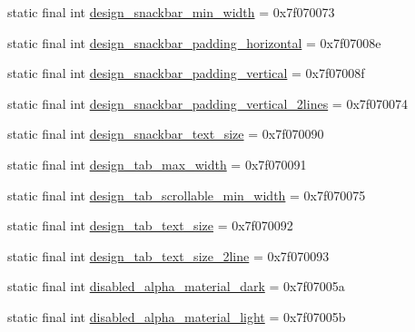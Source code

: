 \begin{CompactItemize}
\item 
static final int \hyperlink{classandroid_1_1support_1_1graphics_1_1drawable_1_1animated_1_1_r_1_1dimen_2cad18cdae992e62fc94d0e0b722ba17}{design\_\-snackbar\_\-min\_\-width} = 0x7f070073
\item 
static final int \hyperlink{classandroid_1_1support_1_1graphics_1_1drawable_1_1animated_1_1_r_1_1dimen_04cf6bea3618ea5459d512cd79711c48}{design\_\-snackbar\_\-padding\_\-horizontal} = 0x7f07008e
\item 
static final int \hyperlink{classandroid_1_1support_1_1graphics_1_1drawable_1_1animated_1_1_r_1_1dimen_9356b49013beb5a8123bce8245151bcc}{design\_\-snackbar\_\-padding\_\-vertical} = 0x7f07008f
\item 
static final int \hyperlink{classandroid_1_1support_1_1graphics_1_1drawable_1_1animated_1_1_r_1_1dimen_418c7ff8184a86f4131600ad2f8f3847}{design\_\-snackbar\_\-padding\_\-vertical\_\-2lines} = 0x7f070074
\item 
static final int \hyperlink{classandroid_1_1support_1_1graphics_1_1drawable_1_1animated_1_1_r_1_1dimen_9b15644ca71d44cdf4914f47d495cc76}{design\_\-snackbar\_\-text\_\-size} = 0x7f070090
\item 
static final int \hyperlink{classandroid_1_1support_1_1graphics_1_1drawable_1_1animated_1_1_r_1_1dimen_aac8383b2586c1712a14bc4a3dc2e253}{design\_\-tab\_\-max\_\-width} = 0x7f070091
\item 
static final int \hyperlink{classandroid_1_1support_1_1graphics_1_1drawable_1_1animated_1_1_r_1_1dimen_e87043aacc2fbac69d85211726f7f22e}{design\_\-tab\_\-scrollable\_\-min\_\-width} = 0x7f070075
\item 
static final int \hyperlink{classandroid_1_1support_1_1graphics_1_1drawable_1_1animated_1_1_r_1_1dimen_204f9d3cb5c09fc68ede0e41037fa015}{design\_\-tab\_\-text\_\-size} = 0x7f070092
\item 
static final int \hyperlink{classandroid_1_1support_1_1graphics_1_1drawable_1_1animated_1_1_r_1_1dimen_bc3a540219acf1014e3d1d0e96bba5d0}{design\_\-tab\_\-text\_\-size\_\-2line} = 0x7f070093
\item 
static final int \hyperlink{classandroid_1_1support_1_1graphics_1_1drawable_1_1animated_1_1_r_1_1dimen_4da89a17ce1795415d4f99305b369137}{disabled\_\-alpha\_\-material\_\-dark} = 0x7f07005a
\item 
static final int \hyperlink{classandroid_1_1support_1_1graphics_1_1drawable_1_1animated_1_1_r_1_1dimen_f7384d31fe8baf47f60600c20a1a027d}{disabled\_\-alpha\_\-material\_\-light} = 0x7f07005b

\end{CompactItemize}
